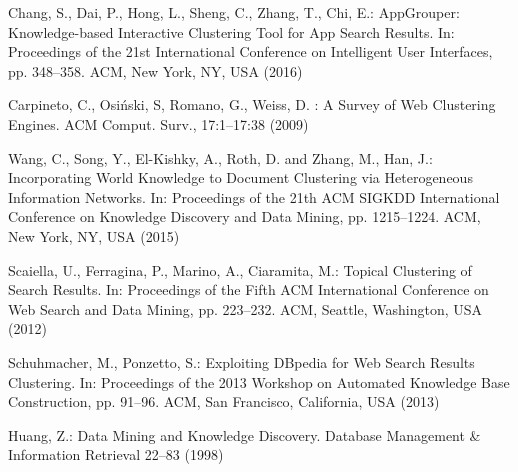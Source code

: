 \documentclass[runningheads]{llncs}
\begin{document}
\begin{thebibliography}{8}
Chang, S., Dai, P., Hong, L., Sheng, C., Zhang, T., Chi, E.: AppGrouper: Knowledge-based Interactive Clustering Tool for App Search Results. In: Proceedings of the 21st International Conference on Intelligent User Interfaces, pp. 348--358. ACM, New York, NY, USA (2016) 

Carpineto, C., Osi\'{n}ski, S, Romano, G., Weiss, D. : A Survey of Web Clustering Engines. ACM Comput. Surv., 17:1--17:38 (2009)

Wang, C., Song, Y., El-Kishky, A., Roth, D. and Zhang, M., Han, J.: Incorporating World Knowledge to Document Clustering via Heterogeneous Information Networks. In: Proceedings of the 21th ACM SIGKDD International Conference on Knowledge Discovery and Data Mining, pp. 1215--1224. ACM, New York, NY, USA (2015)

Scaiella, U., Ferragina, P., Marino, A., Ciaramita, M.: Topical Clustering of Search Results. In: Proceedings of the Fifth ACM International Conference on Web Search and Data Mining, pp. 223--232. ACM, Seattle, Washington, USA (2012) 

Schuhmacher, M., Ponzetto, S.: Exploiting DBpedia for Web Search Results Clustering. In: Proceedings of the 2013 Workshop on Automated Knowledge Base Construction, pp. 91--96. ACM, San Francisco, California, USA (2013) 

Huang, Z.: Data Mining and Knowledge Discovery. Database Management \& Information Retrieval 22--83 (1998)  

\end{thebibliography}

\end{document}
